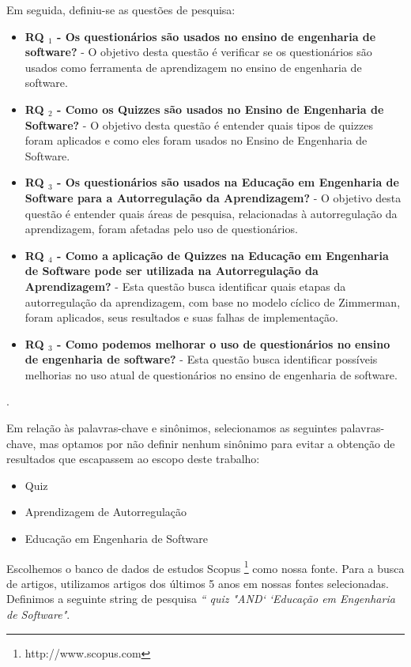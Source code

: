 Em seguida, definiu-se as questões de pesquisa:
\begin{itemize}
    \item\textbf{RQ $ _1 $ - Os questionários são usados no ensino de engenharia de software?} - O objetivo desta questão é verificar se os questionários são usados como ferramenta de aprendizagem no ensino de engenharia de software.
    
\item\textbf{RQ $ _2 $ - Como os Quizzes são usados no Ensino de Engenharia de Software?} - O objetivo desta questão é entender quais tipos de quizzes foram aplicados e como eles foram usados no Ensino de Engenharia de Software.

\item\textbf{RQ $ _3 $ - Os questionários são usados na Educação em Engenharia de Software para a Autorregulação da Aprendizagem?} - O objetivo desta questão é entender quais áreas de pesquisa, relacionadas à autorregulação da aprendizagem, foram afetadas pelo uso de questionários.

\item\textbf{RQ $ _4 $ - Como a aplicação de Quizzes na Educação em Engenharia de Software pode ser utilizada na Autorregulação da Aprendizagem?} - Esta questão busca identificar quais etapas da autorregulação da aprendizagem, com base no modelo cíclico de Zimmerman, foram aplicados, seus resultados e suas falhas de implementação.

\item\textbf{RQ $ _3 $ - Como podemos melhorar o uso de questionários no ensino de engenharia de software?} - Esta questão busca identificar possíveis melhorias no uso atual de questionários no ensino de engenharia de software.
\end{itemize}.

Em relação às palavras-chave e sinônimos, selecionamos as seguintes palavras-chave, mas optamos por não definir nenhum sinônimo para evitar a obtenção de resultados que escapassem ao escopo deste trabalho:

\begin{itemize}
     \item Quiz
     \item Aprendizagem de Autorregulação
     \item Educação em Engenharia de Software
\end{itemize}

Escolhemos o banco de dados de estudos Scopus \footnote{http://www.scopus.com} como nossa fonte. Para a busca de artigos, utilizamos artigos dos últimos 5 anos em nossas fontes selecionadas. Definimos a seguinte string de pesquisa \emph{`` quiz "AND` `Educação em Engenharia de Software"}.

